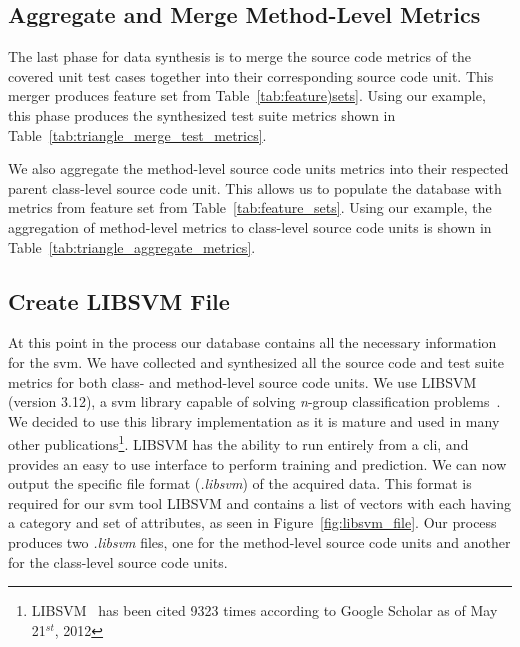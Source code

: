 \subsection{Aggregate and Merge Method-Level Metrics}
\label{subsec:approach_aggregate_merge_metrics}
The last phase for data synthesis is to merge the source code metrics of the covered unit test cases together into their corresponding source code unit. This merger produces feature set  from Table~\ref{tab:feature)sets}. Using our example, this phase produces the synthesized test suite metrics shown in Table~\ref{tab:triangle_merge_test_metrics}.

We also aggregate the method-level source code units metrics into their respected parent class-level source code unit. This allows us to populate the database with metrics from feature set  from Table~\ref{tab:feature_sets}. Using our example, the aggregation of method-level metrics to class-level source code units is shown in Table~\ref{tab:triangle_aggregate_metrics}.


\subsection{Create LIBSVM File}
\label{subsec:approach_create_libsvm_file}
At this point in the process our database contains all the necessary information for the \gls{svm}. We have collected and synthesized all the source code and test suite metrics for both class- and method-level source code units. We use LIBSVM (version 3.12), a \gls{svm} library capable of solving \emph{n}-group classification problems~\cite{CL11}. We decided to use this library implementation as it is mature and used in many other publications\footnote{LIBSVM~\cite{CL11} has been cited 9323 times according to Google Scholar as of May 21$^{st}$, 2012}. LIBSVM has the ability to run entirely from a \gls{cli}, and provides an easy to use interface to perform training and prediction. We can now output the specific file format (\emph{.libsvm}) of the acquired data. This format is required for our \gls{svm} tool LIBSVM and contains a list of vectors with each having a category and set of attributes, as seen in Figure~\ref{fig:libsvm_file}. Our process produces two \emph{.libsvm} files, one for the method-level source code units and another for the class-level source code units.

